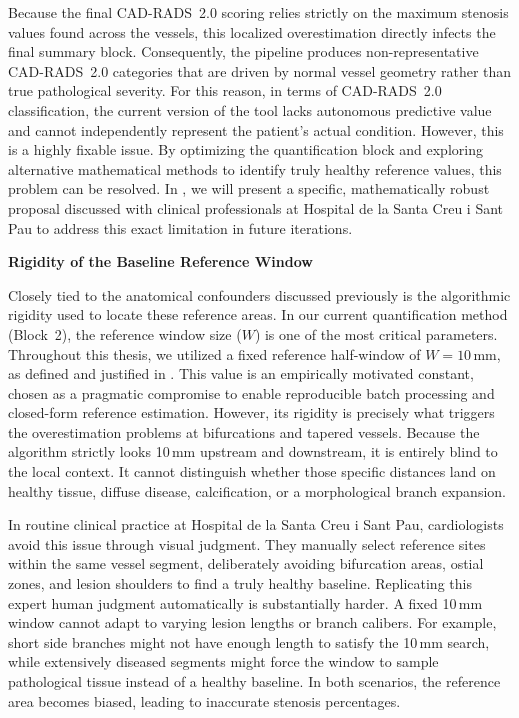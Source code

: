 Because the final CAD-RADS~2.0 scoring relies strictly on the maximum stenosis values found across the vessels, this localized overestimation directly infects the final summary block. Consequently, the pipeline produces non-representative CAD-RADS~2.0 categories that are driven by normal vessel geometry rather than true pathological severity. For this reason, in terms of CAD-RADS~2.0 classification, the current version of the tool lacks autonomous predictive value and cannot independently represent the patient's actual condition. However, this is a highly fixable issue. By optimizing the quantification block and exploring alternative mathematical methods to identify truly healthy reference values, this problem can be resolved. In , we will present a specific, mathematically robust proposal discussed with clinical professionals at Hospital de la Santa Creu i Sant Pau to address this exact limitation in future iterations.

\vspace{0.75em}
\noindent\textbf{Rigidity of the Baseline Reference Window}\par
\vspace{0.4em}
\noindent
Closely tied to the anatomical confounders discussed previously is the algorithmic rigidity used to locate these reference areas. In our current quantification method (Block~2), the reference window size ($W$) is one of the most critical parameters. Throughout this thesis, we utilized a fixed reference half-window of $W = 10$\,mm, as defined and justified in . This value is an empirically motivated constant, chosen as a pragmatic compromise to enable reproducible batch processing and closed-form reference estimation. However, its rigidity is precisely what triggers the overestimation problems at bifurcations and tapered vessels. Because the algorithm strictly looks 10\,mm upstream and downstream, it is entirely blind to the local context. It cannot distinguish whether those specific distances land on healthy tissue, diffuse disease, calcification, or a morphological branch expansion.

In routine clinical practice at Hospital de la Santa Creu i Sant Pau, cardiologists avoid this issue through visual judgment. They manually select reference sites within the same vessel segment, deliberately avoiding bifurcation areas, ostial zones, and lesion shoulders to find a truly healthy baseline. Replicating this expert human judgment automatically is substantially harder. A fixed 10\,mm window cannot adapt to varying lesion lengths or branch calibers. For example, short side branches might not have enough length to satisfy the 10\,mm search, while extensively diseased segments might force the window to sample pathological tissue instead of a healthy baseline. In both scenarios, the reference area becomes biased, leading to inaccurate stenosis percentages.

